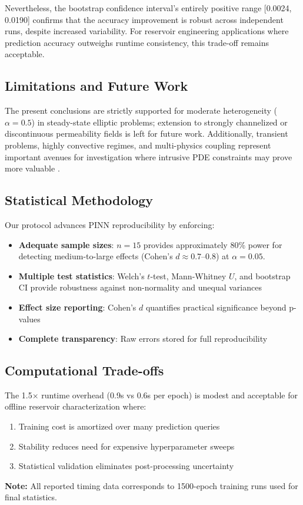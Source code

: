 \documentclass[sn-mathphys]{sn-jnl}
\begin{document}
	Nevertheless, the bootstrap confidence interval's entirely positive range [0.0024, 0.0190] confirms that the accuracy improvement is robust across independent runs, despite increased variability. For reservoir engineering applications where prediction accuracy outweighs runtime consistency, this trade-off remains acceptable.
	
	\subsection{Limitations and Future Work}
	The present conclusions are strictly supported for moderate heterogeneity ($\alpha=0.5$) in steady-state elliptic problems; extension to strongly channelized or discontinuous permeability fields is left for future work. Additionally, transient problems, highly convective regimes, and multi-physics coupling represent important avenues for investigation where intrusive PDE constraints may prove more valuable \citep{tartakovsky2020physics, karniadakis2021physics}.
	
	\subsection{Statistical Methodology}
	Our protocol advances PINN reproducibility by enforcing:
	\begin{itemize}
		\item \textbf{Adequate sample sizes}: $n=15$ provides approximately 80\% power for detecting medium-to-large effects (Cohen's $d \approx 0.7\text{--}0.8$) at $\alpha = 0.05$.
		\item \textbf{Multiple test statistics}: Welch's $t$-test, Mann-Whitney $U$, and bootstrap CI provide robustness against non-normality and unequal variances
		\item \textbf{Effect size reporting}: Cohen's $d$ quantifies practical significance beyond p-values
		\item \textbf{Complete transparency}: Raw errors stored for full reproducibility
	\end{itemize}
	
	\subsection{Computational Trade-offs}
	The 1.5$\times$ runtime overhead (0.9s vs 0.6s per epoch) is modest and 
	acceptable for offline reservoir characterization where:
	\begin{enumerate}
		\item Training cost is amortized over many prediction queries
		\item Stability reduces need for expensive hyperparameter sweeps
		\item Statistical validation eliminates post-processing uncertainty
	\end{enumerate}
	\textbf{Note:} All reported timing data corresponds to 1500-epoch training 
	runs used for final statistics.
\end{document}
